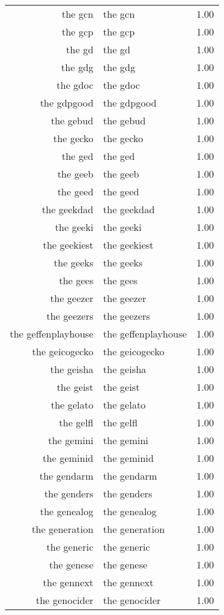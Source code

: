 \begin{table}[ht]
\begin{tabular}{rlr}
  the gcn & the gcn & 1.00 \\ 
  the gcp & the gcp & 1.00 \\ 
  the gd & the gd & 1.00 \\ 
  the gdg & the gdg & 1.00 \\ 
  the gdoc & the gdoc & 1.00 \\ 
  the gdpgood & the gdpgood & 1.00 \\ 
  the gebud & the gebud & 1.00 \\ 
  the gecko & the gecko & 1.00 \\ 
  the ged & the ged & 1.00 \\ 
  the geeb & the geeb & 1.00 \\ 
  the geed & the geed & 1.00 \\ 
  the geekdad & the geekdad & 1.00 \\ 
  the geeki & the geeki & 1.00 \\ 
  the geekiest & the geekiest & 1.00 \\ 
  the geeks & the geeks & 1.00 \\ 
  the gees & the gees & 1.00 \\ 
  the geezer & the geezer & 1.00 \\ 
  the geezers & the geezers & 1.00 \\ 
  the geffenplayhouse & the geffenplayhouse & 1.00 \\ 
  the geicogecko & the geicogecko & 1.00 \\ 
  the geisha & the geisha & 1.00 \\ 
  the geist & the geist & 1.00 \\ 
  the gelato & the gelato & 1.00 \\ 
  the gelfl & the gelfl & 1.00 \\ 
  the gemini & the gemini & 1.00 \\ 
  the geminid & the geminid & 1.00 \\ 
  the gendarm & the gendarm & 1.00 \\ 
  the genders & the genders & 1.00 \\ 
  the genealog & the genealog & 1.00 \\ 
  the generation & the generation & 1.00 \\ 
  the generic & the generic & 1.00 \\ 
  the genese & the genese & 1.00 \\ 
  the gennext & the gennext & 1.00 \\ 
  the genocider & the genocider & 1.00 \\ 

\end{tabular}
\end{table}
